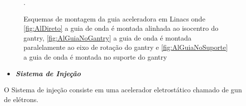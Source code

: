 \documentclass[11pt,a4paper]{article}
\begin{document}
            \begin{figure}[h]
                \centering
                \caption{Esquemas de montagem da guia aceleradora em Linacs onde \ref{fig:AlDireto} a guia de onda é montada alinhada ao isocentro do gantry, \ref{fig:AlGuiaNoGantry} a guia de onda é montada paralelamente ao eixo de rotação do gantry e \ref{fig:AlGuiaNoSuporte} a guia de onda é montada no suporte do gantry}.
                \label{fig:esquemasMontagemGuia}
            \end{figure}

                \begin{itemize}
                    \item \textbf{\textit{\textcolor{CarnationPink}{Sistema de Injeção}}}
                \end{itemize}

    O Sistema de injeção consiste em uma acelerador eletrostático chamado de gun de elétrons.
\end{document}
